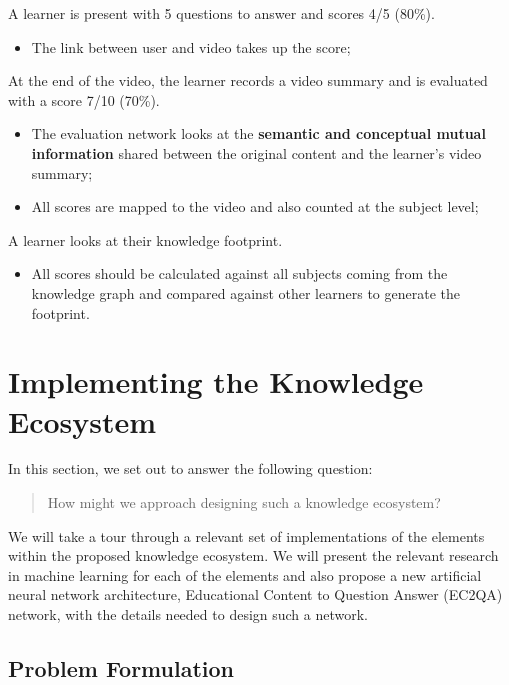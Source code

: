 \documentclass{acm_proc_article-sp}
\providecommand{\tightlist}{%
  \setlength{\itemsep}{0pt}\setlength{\parskip}{0pt}}
\begin{document}
A learner is present with 5 questions to answer and scores 4/5 (80\%).

\begin{itemize}
\tightlist
\item
  The link between user and video takes up the score;
\end{itemize}

At the end of the video, the learner records a video summary and is
evaluated with a score 7/10 (70\%).

\begin{itemize}
\item
  The evaluation network looks at the \textbf{semantic and conceptual
  mutual information} shared between the original content and the
  learner's video summary;
\item
  All scores are mapped to the video and also counted at the subject
  level;
\end{itemize}

A learner looks at their knowledge footprint.

\begin{itemize}
\tightlist
\item
  All scores should be calculated against all subjects coming from the
  knowledge graph and compared against other learners to generate the
  footprint.
\end{itemize}

\chapter{Implementing the Knowledge
Ecosystem}\label{implementing-the-knowledge-ecosystem}

In this section, we set out to answer the following question:

\begin{quote}
How might we approach designing such a knowledge ecosystem?
\end{quote}

We will take a tour through a relevant set of implementations of the
elements within the proposed knowledge ecosystem. We will present the
relevant research in machine learning for each of the elements and also
propose a new artificial neural network architecture, Educational
Content to Question Answer (EC2QA) network, with the details needed to
design such a network.

\section{Problem Formulation}\label{problem-formulation}
\end{document}
